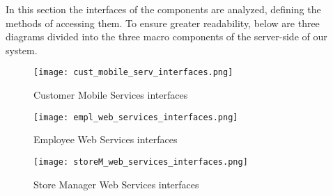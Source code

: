 In this section the interfaces of the components are analyzed, defining the methods of accessing them. To ensure greater readability, below are three diagrams divided into the three macro components of the server-side of our system.

\begin{figure}[H]
    \centering
    \texttt{[image: cust\_mobile\_serv\_interfaces.png]}
    \caption{Customer Mobile Services interfaces}
\end{figure}

\begin{figure}[H]
    \centering
    \texttt{[image: empl\_web\_services\_interfaces.png]}
    \caption{Employee Web Services interfaces}
\end{figure}

\begin{figure}[H]
    \centering
    \texttt{[image: storeM\_web\_services\_interfaces.png]}
    \caption{Store Manager Web Services interfaces}
\end{figure}